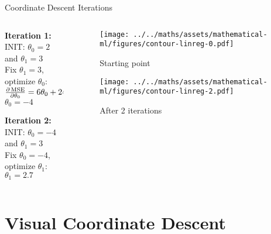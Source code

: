 \documentclass{beamer}
\begin{document}
\begin{frame}{Coordinate Descent Iterations}
\begin{columns}
\begin{column}{0.5\textwidth}
\textbf{Iteration 1:}\\
INIT: $\theta_{0} = 2$ and  $\theta_{1}  = 3$\\
\vspace{0.3cm}
Fix $\theta_1 = 3$, optimize $\theta_{0}$:\\ 
$\frac{\partial \operatorname{MSE}}{\partial \theta_{0}} = 6\theta_0 + 24 = 0$\\
$\theta_0 = -4$

\vspace{0.5cm}
\textbf{Iteration 2:}\\
INIT: $\theta_{0} = -4$ and  $\theta_{1}  = 3$\\
\vspace{0.3cm}
Fix $\theta_0 = -4$, optimize $\theta_{1}$:\\ 
$\theta_1 = 2.7$
\end{column}
\begin{column}{0.5\textwidth}
\begin{figure}
\texttt{[image: ../../maths/assets/mathematical-ml/figures/contour-linreg-0.pdf]}
\caption{{\footnotesize Starting point}}
\end{figure}

\begin{figure}
\texttt{[image: ../../maths/assets/mathematical-ml/figures/contour-linreg-2.pdf]}
\caption{{\footnotesize After 2 iterations}}
\end{figure}
\end{column}
\end{columns}
\end{frame}

\section{Visual Coordinate Descent}
\end{document}
